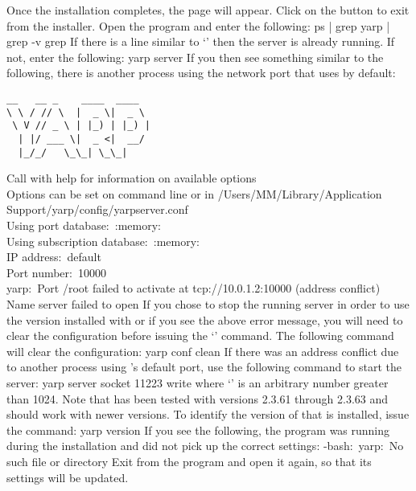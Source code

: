 \newpage
Once the installation completes, the  page will appear.
Click on the  button to exit from the installer.
\newpage
\tertiaryEnd{}
Open the  program and enter the following:
\outputBegin{}
ps | grep yarp | grep -v grep
\outputEnd{}
If there is a line similar to `'
then the \yarp{} server is already running. If not, enter the following:
\outputBegin{}
yarp server
\outputEnd{}
If you then see something similar to the following, there is another process using the
network port that \yarp{} uses by default:
\outputBegin{}
\begin{verbatim}
__   __ _    ____  ____  
\ \ / // \  |  _ \|  _ \ 
 \ V // _ \ | |_) | |_) |
  | |/ ___ \|  _ <|  __/ 
  |_/_/   \_\_| \_\_|    
\end{verbatim}
Call with \longDash{}help for information on available options\\
Options can be set on command line or in /Users/M\textunderscore{}M/Library/Application\\
\hspace*{5em}Support/yarp/config/yarpserver.conf\\
Using port database:\ :memory:\\
Using subscription database:\ :memory:\\
IP address:\ default\\
Port number:\ 10000\\
yarp:\ Port /root failed to activate at tcp://10.0.1.2:10000 (address conflict)\\
Name server failed to open
\outputEnd{}
If you chose to stop the running \yarp{} server in order to use the version installed with
\mplusm{} or if you see the above error message, you will need to clear the \yarp{}
configuration before issuing the `\asCode{yarp~server}' command.
The following command will clear the \yarp{} configuration:
\outputBegin{}
yarp conf \longDash{}clean
\outputEnd{}
If there was an address conflict due to another process using \yarp's default port, use
the following command to start the \yarp{} server:
\outputBegin{}
yarp server \longDash{}socket 11223 \longDash{}write
\outputEnd{}
where `' is an arbitrary number greater than 1024.
Note that \mplusm{} has been tested with \yarp{} versions 2.3.61 through 2.3.63 and should
work with newer versions.
To identify the version of \yarp{} that is installed, issue the command:
\outputBegin{}
yarp version
\outputEnd{}
If you see the following, the  program was running during the
installation and did not pick up the correct settings:
\outputBegin{}
-bash:\ yarp:\ No such file or directory
\outputEnd{}
Exit from the  program and open it again, so that its settings will be
updated.\\

